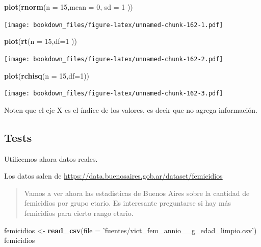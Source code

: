 \documentclass[]{book}
\newenvironment{Shaded}{\begin{snugshade}}{\end{snugshade}}
\newcommand{\DataTypeTok}[1]{\textcolor[rgb]{0.13,0.29,0.53}{#1}}
\newcommand{\DecValTok}[1]{\textcolor[rgb]{0.00,0.00,0.81}{#1}}
\newcommand{\KeywordTok}[1]{\textcolor[rgb]{0.13,0.29,0.53}{\textbf{#1}}}
\newcommand{\NormalTok}[1]{#1}
\newcommand{\StringTok}[1]{\textcolor[rgb]{0.31,0.60,0.02}{#1}}
\begin{document}
\begin{Shaded}
\begin{Highlighting}[]
\KeywordTok{plot}\NormalTok{(}\KeywordTok{rnorm}\NormalTok{(}\DataTypeTok{n =} \DecValTok{15}\NormalTok{,}\DataTypeTok{mean =} \DecValTok{0}\NormalTok{, }\DataTypeTok{sd =} \DecValTok{1}\NormalTok{ ))}
\end{Highlighting}
\end{Shaded}

\texttt{[image: bookdown\_files/figure-latex/unnamed-chunk-162-1.pdf]}

\begin{Shaded}
\begin{Highlighting}[]
\KeywordTok{plot}\NormalTok{(}\KeywordTok{rt}\NormalTok{(}\DataTypeTok{n =} \DecValTok{15}\NormalTok{,}\DataTypeTok{df=}\DecValTok{1}\NormalTok{ ))}
\end{Highlighting}
\end{Shaded}

\texttt{[image: bookdown\_files/figure-latex/unnamed-chunk-162-2.pdf]}

\begin{Shaded}
\begin{Highlighting}[]
\KeywordTok{plot}\NormalTok{(}\KeywordTok{rchisq}\NormalTok{(}\DataTypeTok{n =} \DecValTok{15}\NormalTok{,}\DataTypeTok{df=}\DecValTok{1}\NormalTok{))}
\end{Highlighting}
\end{Shaded}

\texttt{[image: bookdown\_files/figure-latex/unnamed-chunk-162-3.pdf]}

Noten que el eje X es el índice de los valores, es decir que no agrega información.

\hypertarget{tests}{%
\subsection{Tests}\label{tests}}

Utilicemos ahora datos reales.

Los datos salen de \url{https://data.buenosaires.gob.ar/dataset/femicidios}

\begin{quote}
Vamos a ver ahora las estadisticas de Buenos Aires sobre la cantidad de femicidios por grupo etario. Es interesante preguntarse si hay más femicidios para cierto rango etario.
\end{quote}

\begin{Shaded}
\begin{Highlighting}[]
\NormalTok{femicidios <-}\StringTok{ }\KeywordTok{read_csv}\NormalTok{(}\DataTypeTok{file =} \StringTok{'fuentes/vict_fem_annio__g_edad_limpio.csv'}\NormalTok{)}
\NormalTok{femicidios}
\end{Highlighting}
\end{Shaded}
\end{document}
